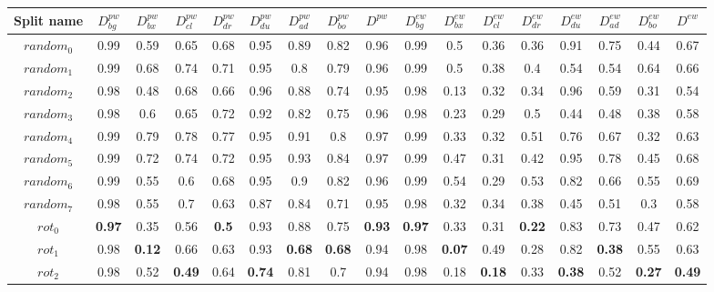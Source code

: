 \documentclass{article}
\begin{document}
\begin{center}
\begin{table}[H]
\tiny \renewcommand{\arraystretch}{1.5} \begin{tabular}{ |c|c|c|c|c|c|c|c|c||c|c|c|c|c|c|c|c| } \hline Split name & $D^{pw}_{bg}$ & $D^{pw}_{bx}$ & $D^{pw}_{cl}$ & $D^{pw}_{dr}$ & $D^{pw}_{du}$ & $D^{pw}_{ad}$ & $D^{pw}_{bo}$ & $D^{pw}$ &  $D^{ew}_{bg}$ & $D^{ew}_{bx}$ & $D^{ew}_{cl}$ & $D^{ew}_{dr}$ & $D^{ew}_{du}$ & $D^{ew}_{ad}$ & $D^{ew}_{bo}$ & $D^{ew}$ \\ [1.05ex] \hline 
$random_0$ &  0.99 & 0.59 & 0.65 & 0.68 & 0.95 & 0.89 & 0.82 & 0.96 &  0.99 & 0.5 & 0.36 & 0.36 & 0.91 & 0.75 & 0.44 & 0.67 \\ \hline 
$random_1$ &  0.99 & 0.68 & 0.74 & 0.71 & 0.95 & 0.8 & 0.79 & 0.96 &  0.99 & 0.5 & 0.38 & 0.4 & 0.54 & 0.54 & 0.64 & 0.66 \\ \hline 
$random_2$ &  0.98 & 0.48 & 0.68 & 0.66 & 0.96 & 0.88 & 0.74 & 0.95 &  0.98 & 0.13 & 0.32 & 0.34 & 0.96 & 0.59 & 0.31 & 0.54 \\ \hline 
$random_3$ &  0.98 & 0.6 & 0.65 & 0.72 & 0.92 & 0.82 & 0.75 & 0.96 &  0.98 & 0.23 & 0.29 & 0.5 & 0.44 & 0.48 & 0.38 & 0.58 \\ \hline 
$random_4$ &  0.99 & 0.79 & 0.78 & 0.77 & 0.95 & 0.91 & 0.8 & 0.97 &  0.99 & 0.33 & 0.32 & 0.51 & 0.76 & 0.67 & 0.32 & 0.63 \\ \hline 
$random_5$ &  0.99 & 0.72 & 0.74 & 0.72 & 0.95 & 0.93 & 0.84 & 0.97 &  0.99 & 0.47 & 0.31 & 0.42 & 0.95 & 0.78 & 0.45 & 0.68 \\ \hline 
$random_6$ &  0.99 & 0.55 & 0.6 & 0.68 & 0.95 & 0.9 & 0.82 & 0.96 &  0.99 & 0.54 & 0.29 & 0.53 & 0.82 & 0.66 & 0.55 & 0.69 \\ \hline 
$random_7$ &  0.98 & 0.55 & 0.7 & 0.63 & 0.87 & 0.84 & 0.71 & 0.95 &  0.98 & 0.32 & 0.34 & 0.38 & 0.45 & 0.51 & 0.3 & 0.58 \\ \hhline{|=|=|=|=|=|=|=|=|=|=|=|=|=|=|=|=|=|}   
$rot_0$ &  \textbf{0.97} & 0.35 & 0.56 & \textbf{0.5} & 0.93 & 0.88 & 0.75 & \textbf{0.93} & \textbf{0.97} & 0.33 & 0.31 & \textbf{0.22} & 0.83 & 0.73 & 0.47 & 0.62 \\ \hline 
$rot_1$ &  0.98 & \textbf{0.12} & 0.66 & 0.63 & 0.93 & \textbf{0.68} & \textbf{0.68} & 0.94 &  0.98 & \textbf{0.07} & 0.49 & 0.28 & 0.82 & \textbf{0.38} & 0.55 & 0.63 \\ \hline 
$rot_2$ &  0.98 & 0.52 & \textbf{0.49} & 0.64 & \textbf{0.74} & 0.81 & 0.7 & 0.94 &  0.98 & 0.18 & \textbf{0.18} & 0.33 & \textbf{0.38} & 0.52 & \textbf{0.27} & \textbf{0.49} \\ \hline 

\end{tabular}
\end{table}
\end{center}
\end{document}
